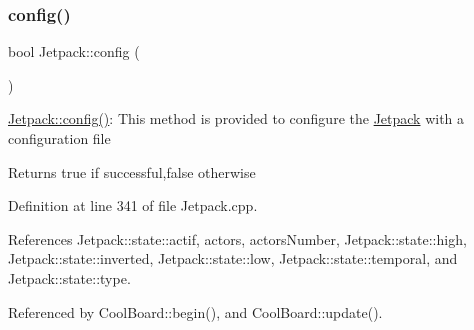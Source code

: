 \subsubsection{\texorpdfstring{config()}{config()}}
{\footnotesize\ttfamily bool Jetpack\+::config (\begin{DoxyParamCaption}{ }\end{DoxyParamCaption})}

\hyperlink{classJetpack_ab065ee83e244265a2223a22f3ee4a719}{Jetpack\+::config()}\+: This method is provided to configure the \hyperlink{classJetpack}{Jetpack} with a configuration file

\begin{DoxyReturn}{Returns}
true if successful,false otherwise 
\end{DoxyReturn}


Definition at line 341 of file Jetpack.\+cpp.



References Jetpack\+::state\+::actif, actors, actors\+Number, Jetpack\+::state\+::high, Jetpack\+::state\+::inverted, Jetpack\+::state\+::low, Jetpack\+::state\+::temporal, and Jetpack\+::state\+::type.



Referenced by Cool\+Board\+::begin(), and Cool\+Board\+::update().


